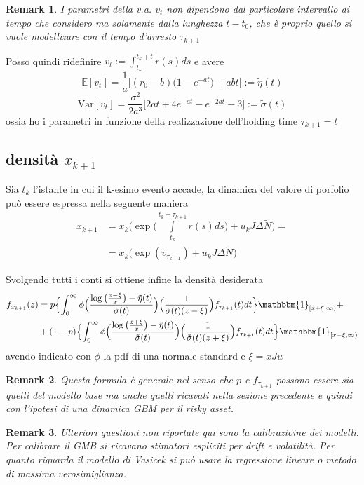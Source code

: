 \documentclass[12pt]{article}
\theoremstyle{break}
\newtheorem{remark}{Remark}
\begin{document}
\begin{remark}
	I parametri della v.a. $v_t$  non dipendono dal particolare intervallo di tempo che considero ma solamente dalla lunghezza $t-t_0$, che è proprio quello si vuole modellizare con il tempo d'arresto $\tau_{k+1}$
\end{remark}
Posso quindi ridefinire $v_t := \int_{t_k}^{t_k+t}r(s)ds$ e avere
\[
\mathbb{E}[v_t] = \frac{1}{a}\Big[(r_0 - b)\big(1-e^{-at}\big)+abt\Big] := \tilde{\eta}(t)
\]
\[
\text{Var}[v_t] = \frac{\sigma^2}{2a^3}\Big[2at + 4e^{-at}-e^{-2at}-3\Big] := \tilde{\sigma}(t)
\]
ossia ho i parametri in funzione della realizzazione dell'holding time $\tau_{k+1} = t$

\subsection{densità $x_{k+1}$}

Sia $t_k$ l'istante in cui il k-esimo evento accade, la dinamica del valore di porfolio può essere espressa nella seguente maniera
\begin{align*}
x_{k+1} & = x_k \Big(\exp\big(\int\limits_{t_k}^{t_k+\tau_{k+1}}r(s)ds\big) + u_k J \Delta\widetilde{N}\Big) = \\
& = x_k \Big(\exp(v_{\tau_{k+1}}) + u_k J \Delta\widetilde{N}\Big)
\end{align*}

Svolgendo tutti i conti si ottiene infine la densità desiderata 
\begin{align}
f_{x_{k+1}}(z) &= p\Bigl\{ \int_{0}^{\infty}\phi\Big(\frac{\log\big(\frac{z-\xi}{x}\big)-\tilde{\eta}(t)}{\tilde{\sigma}(t)}\Big)  \Big(\frac{1}{\tilde{\sigma}(t)(z-\xi)}\Big)f_{\tau_{k+1}}(t)dt\Bigr\}\mathbbm{1}_{[x+\xi,\infty)} \nonumber +\\
& + (1-p)\Bigl\{ \int_{0}^{\infty}\phi\Big(\frac{\log\big(\frac{z+\xi}{x}\big)-\tilde{\eta}(t)}{\tilde{\sigma}(t)}\Big)  \Big(\frac{1}{\tilde{\sigma}(t)(z+\xi)}\Big)f_{\tau_{k+1}}(t)dt\Bigr\}\mathbbm{1}_{[x-\xi,\infty)}
\end{align}
avendo indicato con $\phi$ la pdf di una normale standard e $\xi= xJu$
\begin{remark}
	Questa formula è generale nel senso che $p$ e $f_{\tau_{k+1}}$ possono essere sia quelli del modello base ma anche quelli ricavati nella sezione precedente e quindi con l'ipotesi di una dinamica GBM per il risky asset.
\end{remark}

\begin{remark}
	Ulteriori questioni non riportate qui sono la calibrazioine dei modelli. Per calibrare il GMB si ricavano stimatori espliciti per drift e volatilità. Per quanto riguarda il modello di Vasicek si può usare la regressione lineare o metodo di massima verosimiglianza.
\end{remark}
\end{document}
